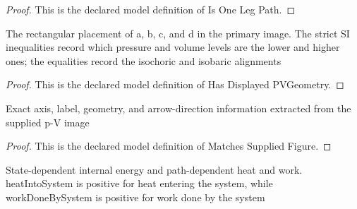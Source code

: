 \begin{proof}
  This is the declared model definition of Is One Leg Path.
\end{proof}
\begin{definition}
  \label{def:physics:phyx-mini-0340:phyxminiproblems-problemphyxmini0340-hasdisplayedpvgeometry}
  The rectangular placement of a, b, c, and d in the primary image. The strict SI inequalities record which pressure and volume levels are the lower and higher ones; the equalities record the isochoric and isobaric alignments
\end{definition}
\begin{proof}
  This is the declared model definition of Has Displayed PVGeometry.
\end{proof}
\begin{definition}
  \label{def:physics:phyx-mini-0340:phyxminiproblems-problemphyxmini0340-matchessuppliedfigure}
  Exact axis, label, geometry, and arrow-direction information extracted from the supplied p-V image
\end{definition}
\begin{proof}
  This is the declared model definition of Matches Supplied Figure.
\end{proof}
\begin{definition}
  \label{def:physics:phyx-mini-0340:phyxminiproblems-problemphyxmini0340-thermodynamicmodel}
  State-dependent internal energy and path-dependent heat and work. heatIntoSystem is positive for heat entering the system, while workDoneBySystem is positive for work done by the system
\end{definition}
